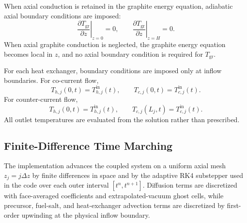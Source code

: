 \documentclass[a4paper,12pt]{article}
\begin{document}
When axial conduction is retained in the graphite energy equation,
adiabatic axial boundary conditions are imposed:
\[
\left.\frac{\partial T_{\mathrm{gr}}}{\partial z}\right|_{z=0}=0,
\qquad
\left.\frac{\partial T_{\mathrm{gr}}}{\partial z}\right|_{z=H}=0.
\]
When axial graphite conduction is neglected, the graphite energy equation
becomes local in $z$, and no axial boundary condition is required for
$T_{\mathrm{gr}}$.

For each heat exchanger, boundary conditions are imposed only at inflow
boundaries. For co-current flow,
\[
T_{h,j}(0,t)=T_{h,j}^{\mathrm{in}}(t),
\qquad
T_{c,j}(0,t)=T_{c,j}^{\mathrm{in}}(t).
\]
For counter-current flow,
\[
T_{h,j}(0,t)=T_{h,j}^{\mathrm{in}}(t),
\qquad
T_{c,j}(L_j,t)=T_{c,j}^{\mathrm{in}}(t).
\]
All outlet temperatures are evaluated from the solution rather than
prescribed.

\subsection{Finite-Difference Time Marching}

The implementation advances the coupled system on a uniform axial mesh
\(z_j=j\Delta z\) by finite differences in space and by the adaptive RK4
substepper used in the code over each outer interval
\([t^n,t^{n+1}]\). Diffusion terms are discretized with face-averaged
coefficients and extrapolated-vacuum ghost cells, while precursor,
fuel-salt, and heat-exchanger advection terms are discretized by
first-order upwinding at the physical inflow boundary.
\end{document}
